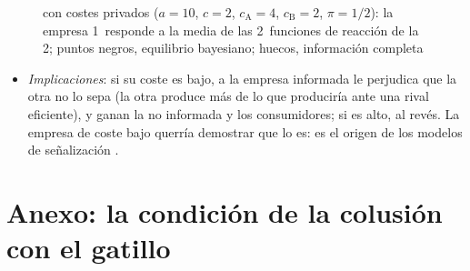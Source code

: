 \documentclass[11pt]{article}
\begin{document}
\begin{figure}[H]
\centering
\caption{ con costes privados ($a=10$, $c=2$, $c_{\mathrm A}=4$, $c_{\mathrm B}=2$, $\pi=1/2$): la empresa 1~responde a la media de las 2~funciones de reacción de la 2; puntos negros, equilibrio bayesiano; huecos, información completa}\label{fig:cournot-bayesiano}
\end{figure}

\begin{itemize}
\item \emph{Implicaciones}: si su coste es bajo, a la empresa informada le perjudica que la otra no lo sepa (la otra produce más de lo que produciría ante una rival eficiente), y ganan la no informada y los consumidores; si es alto, al revés. La empresa de coste bajo querría demostrar que lo es: es el origen de los modelos de señalización .\findemo
\end{itemize}

\section{Anexo: la condición de la colusión con el gatillo}\label{anexo:gatillo}
\end{document}
